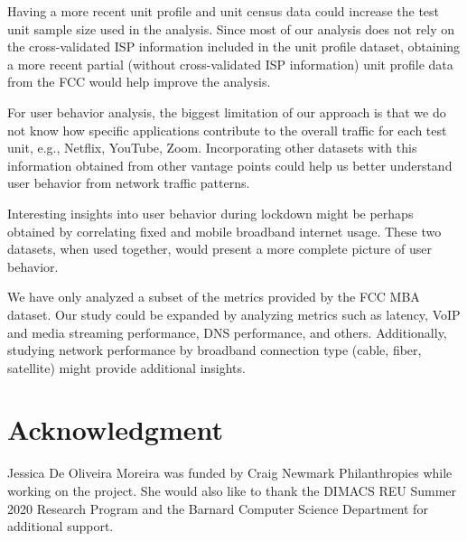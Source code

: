 \documentclass[conference,10pt]{IEEEtran}
\begin{document}
Having a more recent unit profile and unit census data could increase the test unit sample size used in the analysis. Since most of our analysis does not rely on the cross-validated \gls{ISP} information included in the unit profile dataset, obtaining a more recent partial (without cross-validated \gls{ISP} information) unit profile data from the \gls{FCC} would help improve the analysis.

For user behavior analysis, the biggest limitation of our approach is that we do not know how specific applications contribute to the overall traffic for each test unit, e.g., Netflix, YouTube, Zoom. Incorporating other datasets with this information obtained from other vantage points could help us better understand user behavior from network traffic patterns.

Interesting insights into user behavior during lockdown might be perhaps obtained by correlating fixed and mobile broadband internet usage. These two datasets, when used together, would present a more complete picture of user behavior.

We have only analyzed a subset of the metrics provided by the \gls{FCC} \gls{MBA} dataset. Our study could be expanded by analyzing metrics such as latency, \gls{VoIP} and media streaming performance, \gls{DNS} performance, and others. Additionally, studying network performance by broadband connection type (cable, fiber, satellite) might provide additional insights.

\section*{Acknowledgment}\label{sec:acknowledgment}

Jessica De Oliveira Moreira was funded by Craig Newmark Philanthropies while working on the project. She would also like to thank the \gls{DIMACS} REU Summer 2020 Research Program and the Barnard Computer Science Department for additional support.



\end{document}

